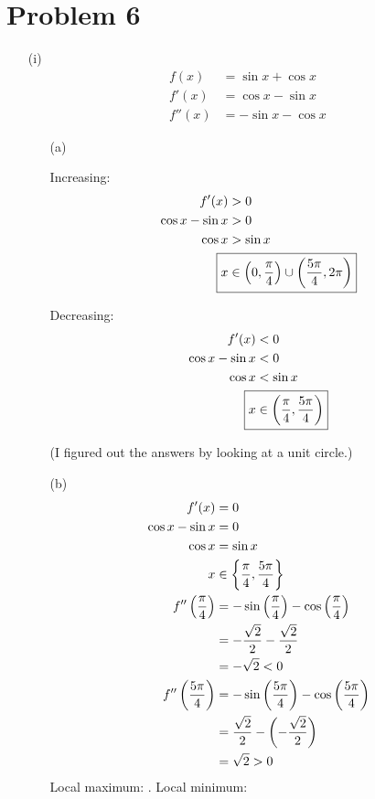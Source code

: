 \documentclass{article}
\newcommand*{\paren}[1]{\ensuremath\left(#1\right)}
\newcommand*{\problem}[1]{\section*{Problem #1}}
\begin{document}
\problem{6}
\begin{itemize}
	\item[(i)]
	\begin{align*}
		f(x)&=\sin x+\cos x \\
		f'(x)&=\cos x-\sin x \\
		f''(x)&=-\sin x-\cos x
	\end{align*}
	\begin{itemize}
		\item[(a)]
		\begin{multicols}{2}
			Increasing:
			\begin{align*}
				f'(x)&>0 \\
				\cos x-\sin x&>0 \\
				\cos x&>\sin x \\
				\Aboxed{x&\in\paren{0,\frac{\pi}{4}}\cup\paren{\frac{5\pi}{4},2\pi}}
			\end{align*}

			\columnbreak

			Decreasing:
			\begin{align*}
				f'(x)&<0 \\
				\cos x-\sin x&<0 \\
				\cos x&<\sin x \\
				\Aboxed{x&\in\paren{\frac{\pi}{4},\frac{5\pi}{4}}}
			\end{align*}
		\end{multicols}
		(I figured out the answers by looking at a unit circle.)

		\item[(b)]
		\begin{align*}
			f'(x)&=0 \\
			\cos x-\sin x&=0 \\
			\cos x&=\sin x \\
			x&\in\left\{\frac{\pi}{4},\frac{5\pi}{4}\right\} \\
			f''\paren{\frac{\pi}{4}}&=-\sin\paren{\frac{\pi}{4}}-\cos\paren{\frac{\pi}{4}} \\
			&=-\frac{\sqrt{2}}{2}-\frac{\sqrt{2}}{2} \\
			&=-\sqrt{2}<0 \\
			f''\paren{\frac{5\pi}{4}}&=-\sin\paren{\frac{5\pi}{4}}-\cos\paren{\frac{5\pi}{4}} \\
			&=\frac{\sqrt{2}}{2}-\paren{-\frac{\sqrt{2}}{2}} \\
			&=\sqrt{2}>0
		\end{align*}
		Local maximum: . Local minimum: 
	

\end{itemize}
\end{itemize}
\end{document}
